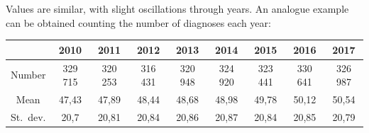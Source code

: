 Values are similar, with slight oscillations through years. An analogue example can be obtained counting the number of diagnoses each year:
\begin{center}
	\small
	\begin{tabular}{c|c|c|c|c|c|c|c|c}
		& 2010 & 2011 & 2012 & 2013 & 2014 & 2015 & 2016 & 2017 \\
		\hline
		Number & 329 715 & 320 253 & 316 431 & 320 948 & 324 920 & 323 441 & 330 641 & 326 987 \\
		\hline
		Mean & 47,43 & 47,89 & 48,44 & 48,68 & 48,98 & 49,78 & 50,12 & 50,54 \\
		\hline
		St.\ dev. & 20,7 & 20,81 & 20,84 & 20,86 & 20,87 & 20,84 & 20,85 & 20,79 \\
	\end{tabular}
\end{center}


